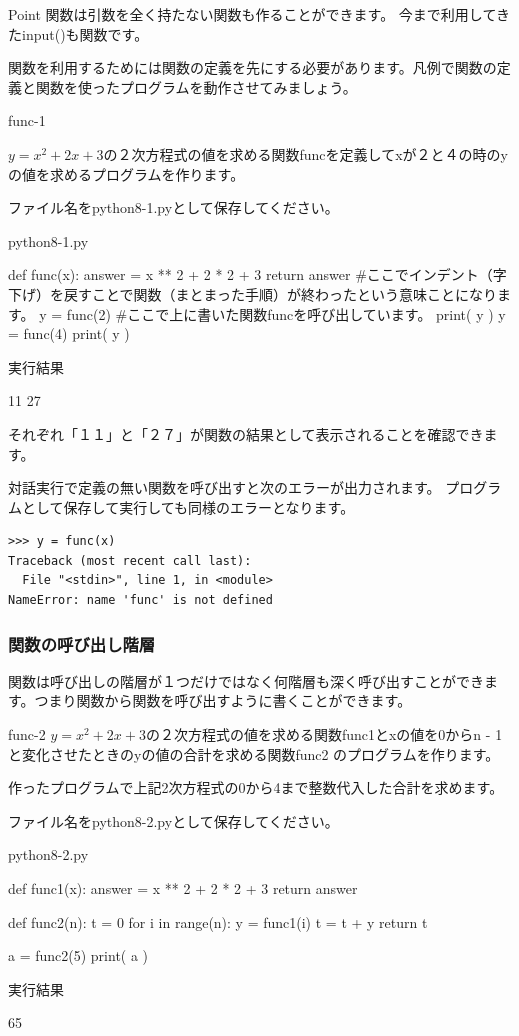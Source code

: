 \documentclass[11pt,a4paper,dvipdfmx,titlepage]{jsreport}
\begin{document}
\begin{hipoint}{Point}
関数は引数を全く持たない関数も作ることができます。
今まで利用してきたinput()も関数です。
\end{hipoint}
関数を利用するためには関数の定義を先にする必要があります。凡例で関数の定義と関数を使ったプログラムを動作させてみましょう。
\newpage
\begin{pabox}{func-1}

$y = x^2 + 2 x + 3$の２次方程式の値を求める関数funcを定義してxが２と４の時のyの値を求めるプログラムを作ります。

ファイル名をpython8-1.pyとして保存してください。
\begin{codebox}{python8-1.py}
\begin{listing}{1}
def func(x):
    answer = x ** 2 + 2 * 2 + 3
    return answer
#ここでインデント（字下げ）を戻すことで関数（まとまった手順）が終わったという意味ことになります。
y = func(2) #ここで上に書いた関数funcを呼び出しています。
print( y )
y = func(4)
print( y )
\end{listing}
実行結果
\begin{listing}{1}
11
27
\end{listing}
\end{codebox}

それぞれ「１１」と「２７」が関数の結果として表示されることを確認できます。
\end{pabox}
 {\gt 対話実行}で定義の無い関数を呼び出すと次のエラーが出力されます。
プログラムとして保存して実行しても同様のエラーとなります。
\begin{verbatim}
>>> y = func(x)
Traceback (most recent call last):
  File "<stdin>", line 1, in <module>
NameError: name 'func' is not defined
\end{verbatim}

\subsubsection{関数の呼び出し階層}
関数は呼び出しの階層が１つだけではなく何階層も深く呼び出すことができます。つまり関数から関数を呼び出すように書くことができます。

\newpage
\begin{pabox}{func-2}
$y = x^2 + 2 x + 3$の２次方程式の値を求める関数func1とxの値を0からn - 1と変化させたときのyの値の合計を求める関数func2
のプログラムを作ります。

作ったプログラムで上記2次方程式の0から4まで整数代入した合計を求めます。

ファイル名をpython8-2.pyとして保存してください。

\begin{codebox}{python8-2.py}
\begin{listing}{1}
def func1(x):
    answer = x ** 2 + 2 * 2 + 3
    return answer

def func2(n):
	t = 0
	for i in range(n):
		y = func1(i)
		t = t + y
	return t

a = func2(5)
print( a )
\end{listing}
実行結果
\begin{listing}{1}
65
\end{listing}
\end{codebox}
\end{pabox}
\end{document}
